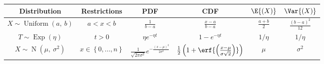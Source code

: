 \documentclass{article}
\begin{document}
\begin{table}[H]
    \centering
    \begin{tabular}{c c c c c c}
        \toprule
        \textbf{Distribution}                                       & \textbf{Restrictions}                  & \textbf{PDF}                                                                         & \textbf{CDF}                                                                            & \(\E{\left( X \right)}\) & \(\Var{\left( X \right)}\)            \\
        \midrule
        \(X \sim \operatorname{Uniform}{\left( a,\: b \right)}\)    & \(a < x < b\)                          & \(\frac{1}{b - a}\)                                                                  & \(\frac{x - a}{b - a}\)                                                                 & \(\frac{a + b}{2}\)      & \(\frac{\left( b - a \right)^2}{12}\) \\
        \(T \sim \operatorname{Exp}{\left( \eta \right)}\)          & \(t > 0\)                              & \(\eta e^{-\eta t}\)                                                                 & \(1 - e^{-\eta t}\)                                                                     & \(1/\eta\)               & \(1/\eta\)                            \\
        \(X \sim \operatorname{N}{\left( \mu,\: \sigma^2 \right)}\) & \(x \in \left\{ 0, \dots, n \right\}\) & \(\frac{1}{\sqrt{2 \pi \sigma^2}} e^{-\frac{\left( x - \mu \right)^2}{2 \sigma^2}}\) & \(\frac{1}{2} \left( 1 + \erf{\left( \frac{x - \mu}{\sigma \sqrt{2}} \right)} \right)\) & \(\mu\)                  & \(\sigma^2\)                          \\
        \bottomrule
    \end{tabular}
\end{table}
\end{document}
